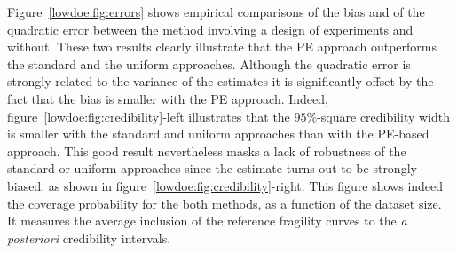 Figure~\ref{lowdoe:fig:errors} shows empirical comparisons of the bias and of the quadratic error between the method involving a design of experiments and without. These two results clearly illustrate that the PE approach outperforms the standard {and the uniform} approaches. Although the quadratic error is strongly related to the variance of the estimates it is significantly offset by the fact that the bias is smaller with the PE approach. Indeed, figure~\ref{lowdoe:fig:credibility}-left illustrates that the $95\%$-square credibility width is smaller with the standard {and uniform} approaches than with the PE-based approach. This good result nevertheless masks a lack of robustness of the standard {or uniform}  approaches since the estimate turns out to be strongly biased, as shown in figure~\ref{lowdoe:fig:credibility}-right. This figure shows indeed the coverage probability for the both methods, as a function of the dataset size. It measures the average inclusion of the reference fragility curves to the \emph{a posteriori} credibility intervals.





